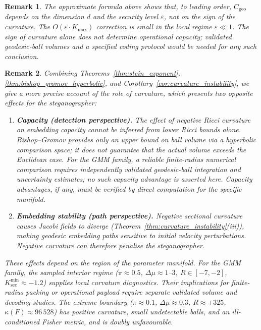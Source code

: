 \documentclass[a4paper,fleqn]{cas-dc}
\newtheorem{remark}{Remark}
\begin{document}
\begin{remark}%
\label{rem:no_curvature_mono}
The approximate formula above shows that, to leading order, 
$C_{\mathrm{geo}}$ depends on the dimension $d$ and the security level 
$\varepsilon$, not on the sign of the curvature.  
The $O(\varepsilon\cdot K_{\max})$ correction is small in the local regime 
$\varepsilon\ll 1$.  
The sign of curvature alone does not determine operational capacity;
validated geodesic-ball volumes and a specified coding protocol would
be needed for any such conclusion.
\end{remark}

\begin{remark}%
\label{rem:two_faces_curvature}
Combining Theorems~\ref{thm:stein_exponent}, \ref{thm:bishop_gromov_hyperbolic}, 
and Corollary~\ref{cor:curvature_instability}, we give a more precise account 
of the role of curvature, which presents two opposite effects for the 
steganographer:
\begin{enumerate}
\item \textbf{Capacity (detection perspective).}  
The effect of negative Ricci curvature on embedding capacity cannot be inferred 
from lower Ricci bounds alone.  
Bishop--Gromov provides only an upper bound on ball volume via a hyperbolic 
comparison space; it does not guarantee that the actual volume exceeds the 
Euclidean case.  
For the GMM family, a reliable finite-radius numerical comparison requires independently validated geodesic-ball integration and uncertainty estimates; no such capacity advantage is asserted here.
Capacity advantages, if any, must be verified by direct computation for the 
specific manifold.

\item \textbf{Embedding stability (path perspective).}  
Negative sectional curvature causes Jacobi fields to diverge 
(Theorem~\ref{thm:curvature_instability}(iii)), making geodesic embedding 
paths sensitive to initial velocity perturbations.  
Negative curvature can therefore penalise the steganographer.
\end{enumerate}
These effects depend on the region of the parameter manifold.  
For the GMM family, the sampled interior regime
($\pi\approx 0.5$, $\Delta\mu\approx 1$--$3$, $R\in[-7,-2]$,
$K_{\mathrm{sec}}^{\min}\approx -1.2$) supplies local curvature diagnostics.
Their implications for finite-radius packing or operational payload require
separate validated volume and decoding studies.
The extreme boundary ($\pi\approx 0.1$, $\Delta\mu\approx 0.3$, $R\approx +325$, 
$\kappa(F)\approx 96\,528$) has positive curvature, small undetectable balls, 
and an ill-conditioned Fisher metric, and is doubly unfavourable.
\end{remark}
\end{document}
